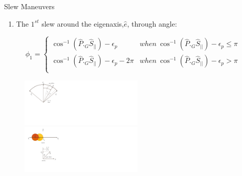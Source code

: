 \documentclass{beamer}
\begin{document}
\begin{frame}
\begin{block}{Slew Maneuvers}
\begin{enumerate}
\item The $1^{st}$ slew around the eigenaxis,$\hat{e}$, through angle:
\end{enumerate}
 \begin{equation}
 \phi_1=\left\{
                \begin{array}{ll}
                 \cos^{-1}(\hat{P}._G\hat{S}_{||})-\epsilon_p& when\  \cos^{-1}(\hat{P}._G\hat{S}_{||})-\epsilon_p\leq \pi\\
                 \cos^{-1}(\hat{P}._G\hat{S}_{||})-\epsilon_p-2\pi& when\ \cos^{-1}(\hat{P}._G\hat{S}_{||})-\epsilon_p>\pi\\
                \end{array}
              \right.
 \end{equation}
\begin{figure}
\includegraphics[width=2.3in]{./Figures/SVAS_1r}\includegraphics[width=2.3in]{./Figures/SVAS_1rb}
\end{figure}
\end{block}
\end{frame}
\end{document}
